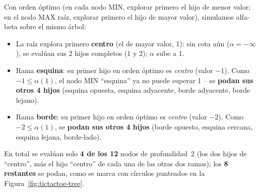 \documentclass[11pt,onecolumn,letterpaper]{article}
\begin{document}
Con orden \'optimo (en cada nodo MIN, explorar primero el hijo de menor valor; en el nodo
MAX ra\'iz, explorar primero el hijo de mayor valor), simulamos alfa-beta sobre el mismo
\'arbol:
\begin{itemize}[leftmargin=1.4em]
\item La ra\'iz explora primero \textbf{centro} (el de mayor valor, 1): sin cota a\'un
  ($\alpha=-\infty$), se eval\'uan sus 2 hijos completos (1 y 2); $\alpha$ sube a 1.
\item Rama \textbf{esquina}: su primer hijo en orden \'optimo es \emph{centro} (valor
  $-1$). Como $-1\le\alpha(1)$, el nodo MIN ``esquina'' ya no puede superar 1
  -- se \textbf{podan sus otros 4 hijos} (esquina opuesta, esquina adyacente, borde
  adyacente, borde lejano).
\item Rama \textbf{borde}: su primer hijo en orden \'optimo es \emph{centro} (valor
  $-2$). Como $-2\le\alpha(1)$, se \textbf{podan sus otros 4 hijos} (borde opuesto,
  esquina cercana, esquina lejana, borde-lado).
\end{itemize}
En total se eval\'uan solo \textbf{4 de los 12} nodos de profundidad~2 (los dos hijos de
``centro'', m\'as el hijo ``centro'' de cada una de las otras dos ramas); los
\textbf{8 restantes} se podan, como se marca con c\'irculos punteados en la
Figura~\ref{fig:tictactoe-tree}.
\end{document}
